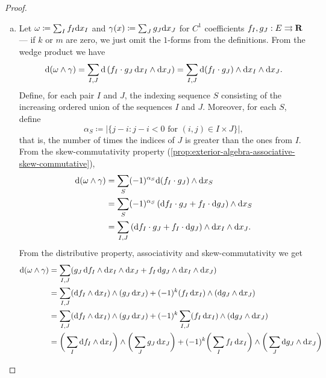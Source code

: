 \begin{proof}
\begin{enumerate}[(a)]\setlength\itemsep{0em}
\item Let \(\omega \coloneq \sum_I f_{I} \mathrm{d} x_I\) and \(\gamma(x)
  \coloneq \sum_J g_{J} \mathrm{d} x_{J}\) for \(C^1\) coefficients \(f_I, g_J: E
  \rightrightarrows \mathbf{R}\) --- if \(k\) or \(m\) are zero, we just omit the
  \(1\)-forms from the definitions. From the wedge product we have
  \[
    \mathrm{d}(\omega \wedge \gamma)
    = \sum_{I, J} \mathrm{d}\left( f_I \cdot g_J\, \mathrm{d} x_I \wedge \mathrm{d} x_J \right)
    = \sum_{I, J} \mathrm{d}(f_I \cdot g_J) \wedge \mathrm{d} x_I \wedge \mathrm{d} x_J.
  \]
  Define, for each pair \(I\) and \(J\), the indexing sequence \(S\)
  consisting of the increasing ordered union of the sequences \(I\) and
  \(J\). Moreover, for each \(S\), define
  \[
    \alpha_S \coloneq |\{j - i : j - i < 0 \text{ for }
    (i, j) \in I \times J\}|,
  \]
  that is, the number of times the indices of \(J\) is greater than the ones
  from \(I\). From the skew-commutativity property
  (\cref{prop:exterior-algebra-associative-skew-commutative}),
  \begin{align*}
    \mathrm{d} (\omega \wedge \gamma)
    &= \sum_S (-1)^{\alpha_S} \mathrm{d}(f_{I} \cdot g_{J}) \wedge \mathrm{d} x_{S} \\
    &= \sum_S (-1)^{\alpha_S}
    \left( \mathrm{d} f_I \cdot g_J + f_I \cdot \mathrm{d} g_J \right)
    \wedge \mathrm{d} x_{S} \\
    &= \sum_{I, J} \left( \mathrm{d} f_I \cdot g_J + f_I \cdot \mathrm{d} g_J \right)
    \wedge \mathrm{d} x_I \wedge \mathrm{d} x_J.
  \end{align*}
  From the distributive property, associativity and skew-commutativity we get
  \begin{align*}
    \diff(\omega \wedge \gamma)
    &= \sum_{I, J} (g_J\, \diff f_I \wedge \diff x_I \wedge \diff x_J
    +  f_I\, \diff g_J \wedge \diff x_I \wedge \diff x_J) \\
    &= \sum_{I, J} (\diff f_I \wedge \diff x_I) \wedge (g_J\, \diff x_J)
      + (-1)^k (f_I\, \diff x_I) \wedge (\diff g_J \wedge \diff x_J) \\
    &= \sum_{I, J} (\diff f_I \wedge \diff x_I) \wedge (g_J\, \diff x_J)
      + (-1)^k \sum_{I, J} (f_I\, \diff x_I) \wedge (\diff g_J \wedge \diff x_J)
    \\
    &= \bigg( \sum_I \diff f_I \wedge \diff x_I\bigg) \wedge
      \bigg( \sum_J g_J\, \diff x_J \bigg)
      + (-1)^k \bigg( \sum_I f_I\, \diff x_I \bigg) \wedge
      \bigg( \sum_J \diff g_J \wedge \diff x_J \bigg) \\

\end{align*}
\end{enumerate}
\end{proof}
